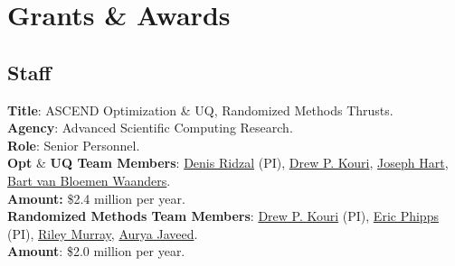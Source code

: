 \documentclass[11pt, a4paper]{article}
\newcommand{\years}[1]{\marginnote{#1}}
\begin{document}
\section*{Grants \& Awards}
\subsection*{Staff}
\years{2024} \textbf{Title}: ASCEND Optimization \& UQ, Randomized Methods Thrusts. \\
\textbf{Agency}: Advanced Scientific Computing Research. \\
\textbf{Role}: Senior Personnel.\\
\textbf{Opt} \& \textbf{UQ Team Members}:
\href{https://cfwebprod.sandia.gov/cfdocs/CompResearch/templates/insert/profile.cfm?dridzal}{Denis Ridzal} (PI),
\href{https://cfwebprod.sandia.gov/cfdocs/CompResearch/templates/insert/profile.cfm?dpkouri}{Drew P. Kouri},
\href{https://www.sandia.gov/ccr/staff/joseph-lee-hart/}{Joseph Hart},
\href{https://www.sandia.gov/ccr/staff/bart-g-van-bloemen-waanders/}{Bart van Bloemen Waanders}. \\
\textbf{Amount:} \$2.4 million per year.\\
\textbf{Randomized Methods Team Members}:
\href{https://cfwebprod.sandia.gov/cfdocs/CompResearch/templates/insert/profile.cfm?dpkouri}{Drew P. Kouri} (PI),
\href{https://www.sandia.gov/ccr/staff/eric-t-phipps/}{Eric Phipps} (PI),
\href{https://rileyjmurray.wordpress.com/}{Riley Murray},
\href{https://rol.sandia.gov/team/}{Aurya Javeed}. \\
\textbf{Amount}: \$2.0 million per year.
\end{document}
